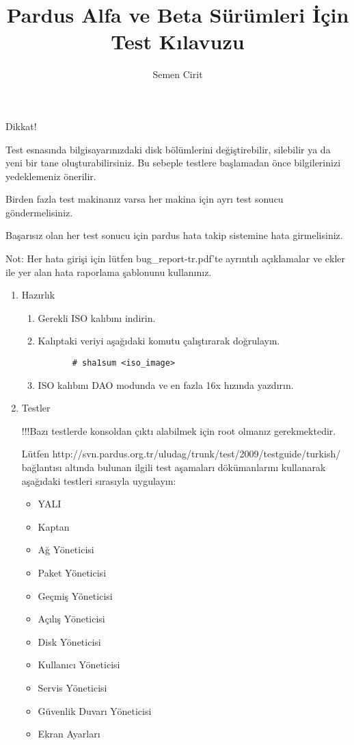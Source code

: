 \documentclass[a4paper,10pt]{article}
\title{Pardus Alfa ve Beta Sürümleri İçin Test Kılavuzu}
\author{Semen Cirit}
\begin{document}
\maketitle

Dikkat!

    Test esnasında bilgisayarınızdaki disk bölümlerini değiştirebilir, silebilir ya da yeni bir tane oluşturabilirsiniz. Bu sebeple testlere başlamadan önce bilgilerinizi yedeklemeniz önerilir.
    
    Birden fazla test makinanız varsa her makina için ayrı test sonucu göndermelisiniz.

    Başarısız olan her test sonucu için pardus hata takip sistemine hata girmelisiniz.

    Not: Her hata girişi için lütfen bug\_report-tr.pdf'te ayrıntılı açıklamalar ve ekler ile yer alan hata raporlama şablonunu kullanınız.

\begin{enumerate}
\item Hazırlık
  \begin{enumerate}
    \item Gerekli ISO kalıbını indirin.
    \item Kalıptaki veriyi aşağıdaki komutu çalıştırarak doğrulayın.
      \begin{verbatim}
       # sha1sum <iso_image>
      \end{verbatim}
    \item ISO kalıbını DAO modunda ve en fazla 16x hızında yazdırın.
  \end{enumerate}
  \item Testler
    
 	!!!Bazı testlerde konsoldan çıktı alabilmek için root olmanız gerekmektedir.
	
    Lütfen http://svn.pardus.org.tr/uludag/trunk/test/2009/testguide/turkish/ bağlantısı altında bulunan ilgili test aşamaları dökümanlarını kullanarak aşağıdaki testleri sırasıyla uygulayın:
    \begin{itemize}
    \item YALI
    \item Kaptan
    \item Ağ Yöneticisi
    \item Paket Yöneticisi
    \item Geçmiş Yöneticisi
    \item Açılış Yöneticisi
    \item Disk Yöneticisi
    \item Kullanıcı Yöneticisi
    \item Servis Yöneticisi
    \item Güvenlik Duvarı Yöneticisi
    \item Ekran Ayarları
    \end{itemize}
 \end{enumerate}
\end{document}

